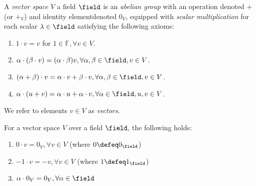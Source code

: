 
\begin{definition}
    A \emph{vector space} $V$  a field $\field$ is an \emph{abelian group} with an operation denoted $+$ (or $+_V$) and identity element\footnotemark denoted $0_V$, equipped with \emph{scalar multiplication} for each scalar $\lambda \in \field$ satisfying the following axioms:
    \begin{enumerate}
        \item $1 \cdot v = v$ for $1 \in \mathbb{F}, \forall v \in V$.
        \item $\alpha\cdot(\beta \cdot v) = (\alpha \cdot \beta)v, \forall \alpha, \beta \in \field, v \in V$.
        \item $(\alpha + \beta) \cdot v = \alpha \cdot v + \beta \cdot v, \forall \alpha, \beta \in \field, v \in V$.
        \item $\alpha \cdot (u + v) = \alpha \cdot u + \alpha \cdot v, \forall \alpha \in \field, u, v \in V$.
    \end{enumerate}
    We refer to elements $v \in V$ as \emph{vectors}.
\end{definition}

\begin{proposition}
    For a vector space $V$ over a field $\field$, the following holds:
    \begin{enumerate}
        \item $0 \cdot v = 0_V, \forall v \in V$ (where $0\defeq0_\field$)
        \item $-1 \cdot v = -v, \forall v \in V$ (where $1\defeq1_\field$)\footnotemark
        \item $\alpha \cdot 0_V = 0_V, \forall \alpha \in \field$
    \end{enumerate}
\end{proposition}


